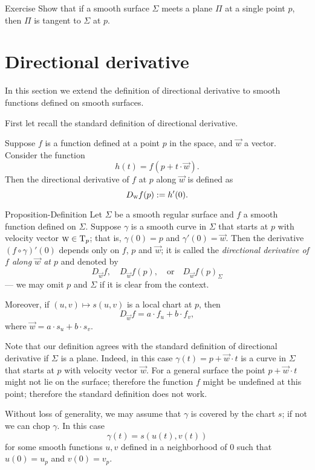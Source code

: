 \begin{thm}{Exercise}\label{ex:tangent-single-point}
Show that if a smooth surface $\Sigma$ meets a plane $\Pi$ at a single point $p$, then $\Pi$ is tangent to $\Sigma$ at $p$.
\end{thm}


\section{Directional derivative}

In this section we extend the definition of directional derivative to smooth functions defined on smooth surfaces.

First let recall the standard definition of directional derivative.

Suppose $f$ is a function defined at a point $p$ in the space, and $\vec w$ a vector.
Consider the function
\[h(t)=f(p+t\cdot\vec w).\]
Then the directional derivative of $f$ at $p$ along $\vec w$ is defined as 
\[D_{\text{\sc{w}}}f(p):= h'(0).\]

\begin{thm}{Proposition-Definition}\label{def:directional-derivative}
Let $\Sigma$ be a smooth regular surface and $f$ a smooth function defined on $\Sigma$. 
Suppose $\gamma$ is a smooth curve in $\Sigma$ that starts at $p$ with velocity vector $\text{\sc{w}}\in \mathrm{T}_p$;
that is, $\gamma(0)=p$ and $\gamma'(0)=\vec{w}$.
Then the derivative $(f\circ\gamma)'(0)$
depends only on $f$, $p$ and $\vec{w}$;
it is called the \emph{directional derivative of $f$ along $\vec{w}$ at $p$}
and denoted by
\[D_{\vec{w}}f,\quad D_{\vec{w}}f(p), \quad\text{or}\quad D_{\vec{w}}f(p)_\Sigma\] 
--- we may omit $p$ and $\Sigma$ if it is clear from the context.

Moreover, if $(u,v)\mapsto s(u,v)$ is a local chart at $p$, then 
\[D_{\vec{w}}f=a\cdot f_u+b\cdot f_v,\]
where $\vec{w}=a\cdot s_u +b\cdot s_v$. 
\end{thm}

Note that our definition agrees with the standard definition of directional derivative if $\Sigma$ is a plane.
Indeed, in this case $\gamma(t)=p+\vec w\cdot t$ is a curve in $\Sigma$ that starts at $p$ with velocity vector $\vec{w}$.
For a general surface the point $p+\vec w\cdot t$ might not lie on the surface; therefore the function $f$ might be undefined at this point; therefore the standard definition does not work.

Without loss of generality, we may assume that $\gamma$ is covered by the chart $s$;
if not we can chop $\gamma$.
In this case 
\[\gamma(t)=s(u(t),v(t))\]
for some smooth functions $u,v$ defined in a neighborhood of $0$ such that 
$u(0)=u_p$ and $v(0)=v_p$.


